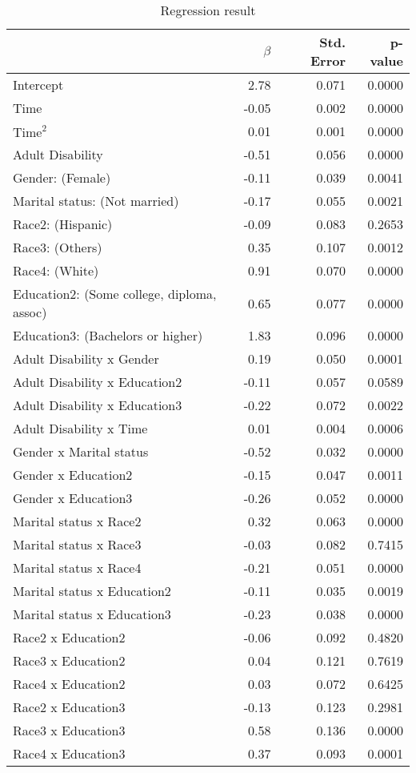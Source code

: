 \begin{table}[H]
\footnotesize
\centering
\caption{Regression result} 
\begin{tabular}{lrrr}
  \hline
  & $\beta$ & Std. Error & p-value \\ 
  \hline
  Intercept & 2.78 & 0.071 & 0.0000 \\ 
  Time & -0.05 & 0.002 & 0.0000 \\ 
  $\text{Time}^2$ & 0.01 & 0.001 & 0.0000 \\ 
  Adult Disability & -0.51 & 0.056 & 0.0000 \\ 
  Gender: (Female) & -0.11 & 0.039 & 0.0041 \\ 
  Marital status: (Not married) & -0.17 & 0.055 & 0.0021 \\ 
  Race2: (Hispanic) & -0.09 & 0.083 & 0.2653 \\ 
  Race3: (Others) & 0.35 & 0.107 & 0.0012 \\ 
  Race4: (White) & 0.91 & 0.070 & 0.0000 \\ 
  Education2: (Some college, diploma, assoc) & 0.65 & 0.077 & 0.0000 \\ 
  Education3: (Bachelors or higher) & 1.83 & 0.096 & 0.0000 \\ 
  Adult Disability x Gender & 0.19 & 0.050 & 0.0001 \\ 
  Adult Disability x Education2 & -0.11 & 0.057 & 0.0589 \\ 
  Adult Disability x Education3 & -0.22 & 0.072 & 0.0022 \\ 
  Adult Disability x Time & 0.01 & 0.004 & 0.0006 \\ 
  Gender x Marital status & -0.52 & 0.032 & 0.0000 \\ 
  Gender x Education2 & -0.15 & 0.047 & 0.0011 \\ 
  Gender x Education3 & -0.26 & 0.052 & 0.0000 \\ 
  Marital status x Race2 & 0.32 & 0.063 & 0.0000 \\ 
  Marital status x Race3 & -0.03 & 0.082 & 0.7415 \\ 
  Marital status x Race4 & -0.21 & 0.051 & 0.0000 \\ 
  Marital status x Education2 & -0.11 & 0.035 & 0.0019 \\ 
  Marital status x Education3 & -0.23 & 0.038 & 0.0000 \\ 
  Race2 x Education2 & -0.06 & 0.092 & 0.4820 \\ 
  Race3 x Education2 & 0.04 & 0.121 & 0.7619 \\ 
  Race4 x Education2 & 0.03 & 0.072 & 0.6425 \\ 
  Race2 x Education3 & -0.13 & 0.123 & 0.2981 \\ 
  Race3 x Education3 & 0.58 & 0.136 & 0.0000 \\ 
  Race4 x Education3 & 0.37 & 0.093 & 0.0001 \\ 
  \hline
\end{tabular}
\label{tab:Table2Reg}
\end{table}

